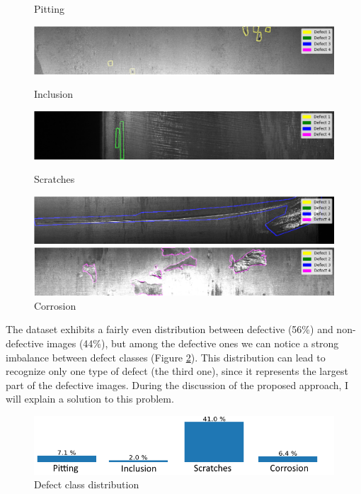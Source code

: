 \documentclass[10pt,twocolumn,letterpaper]{article}
\begin{document}
   \begin{figure}[h]
      \centering
      \caption{Pitting} \label{fig:defect1}
      \includegraphics[scale=0.3]{Img_Defect1}
      \caption{Inclusion} \label{fig:defect2}
      \includegraphics[scale=0.3]{Img_Defect2}
      \caption{Scratches} \label{fig:defect3}
      \includegraphics[scale=0.3]{Img_Defect3}
      \caption{Corrosion} \label{fig:defect4}
      \includegraphics[scale=0.3]{Img_Defect4}
   \end{figure}

   The dataset exhibits a fairly even distribution between defective (56\%) and non-defective images (44\%), but among the defective ones we can notice a strong imbalance between defect classes (Figure \ref{fig:classImbalance}). This distribution can lead to recognize only one type of defect (the third one), since it represents the largest part of the defective images. During the discussion of the proposed approach, I will explain a solution to this problem.

   \begin{figure}[h]
      \centering
      \caption{Defect class distribution} \label{fig:classImbalance}
      \includegraphics[scale=0.45]{Img_ClassImbalance}
   \end{figure}
\end{document}

